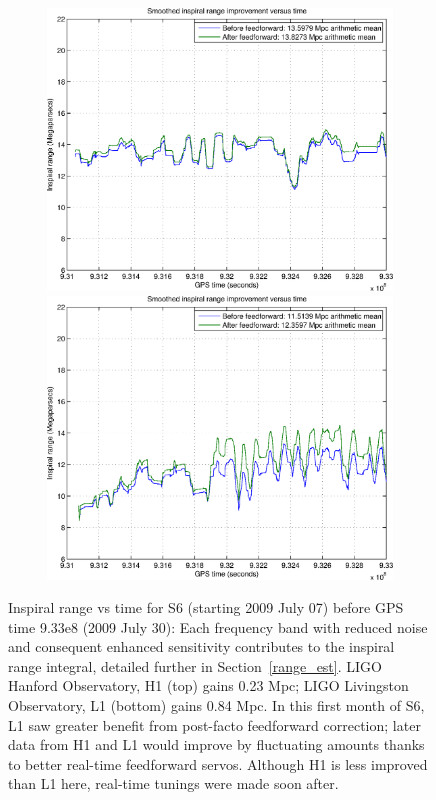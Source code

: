 \begin{figure}
\begin{center}
\includegraphics[height=75mm, width=150mm]{figure14a.eps}
\includegraphics[height=75mm, width=150mm]{figure14b.eps}
\caption{Inspiral range vs time for S6 (starting 2009 July 07) before GPS time 9.33e8 (2009 July 30):
Each frequency band with reduced noise and consequent enhanced sensitivity contributes to the inspiral range integral, detailed further in Section~\ref{range_est}. 
LIGO Hanford Observatory, H1 (top) gains 0.23 Mpc; LIGO Livingston Observatory, L1 (bottom) gains 0.84 Mpc. In this first month of S6, L1 saw greater benefit from post-facto feedforward correction; later data from H1 and L1 would improve by fluctuating amounts thanks to better real-time feedforward servos. Although H1 is less improved than L1 here, real-time tunings were made soon after.
}
\label{S6inspiralRange}
\end{center}
\end{figure}

